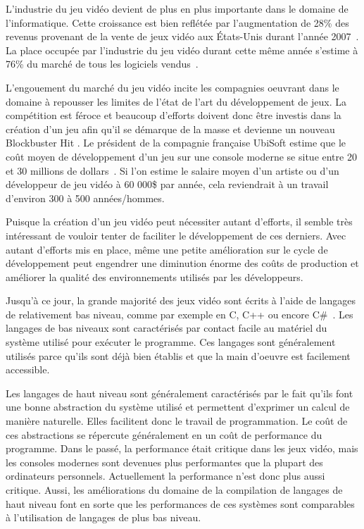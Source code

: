 \documentclass[12pt,oneside,letterpaper,francais]{book}
\begin{document}
L'industrie du jeu vidéo devient de plus en plus importante dans le
domaine de l'informatique. Cette croissance est bien reflétée par
l'augmentation de 28\% des revenus provenant de la vente de jeux vidéo
aux États-Unis durant l'année 2007~\cite{NPD_Games_2007}. La place
occupée par l'industrie du jeu vidéo durant cette même année s'estime
à 76\% du marché de tous les logiciels vendus~\cite{NPD_Soft_2008}. 

L'engouement du marché du jeu vidéo incite les compagnies oeuvrant
dans le domaine à repousser les limites de l'état de l'art du
développement de jeux. La compétition est féroce et beaucoup
d'efforts doivent donc être investis dans la création d'un jeu afin qu'il
se démarque de la masse et devienne un nouveau \og Blockbuster Hit
\fg. Le président de la compagnie française UbiSoft estime que le coût
moyen de développement d'un jeu sur une console moderne se situe entre
20 et 30 millions de dollars~\cite{cbc_ubisoft}. Si l'on estime le
salaire moyen d'un artiste ou d'un développeur de jeu vidéo à 60
000\$ par année, cela reviendrait à un travail d'environ 300 à 500
années/hommes.

Puisque la création d'un jeu vidéo peut nécessiter autant d'efforts,
il semble très intéressant de vouloir tenter de faciliter le
développement de ces derniers. Avec autant d'efforts mis en place,
même une petite amélioration sur le cycle de développement peut
engendrer une diminution énorme des coûts de production et améliorer
la qualité des environnements utilisés par les développeurs.

Jusqu'à ce jour, la grande majorité des jeux vidéo sont écrits à
l'aide de langages de relativement bas niveau, comme par exemple en C,
C++ ou encore C\#~\cite{CSHARP_SPEC}. Les langages de bas niveaux sont
caractérisés par contact facile au matériel du système utilisé pour
exécuter le programme. Ces langages sont généralement utilisés parce
qu'ils sont déjà bien établis et que la main d'oeuvre est facilement
accessible.

Les langages de haut niveau sont généralement caractérisés par le fait
qu'ils font une bonne abstraction du système utilisé et permettent
d'exprimer un calcul de manière naturelle. Elles facilitent donc le
travail de programmation. Le coût de ces abstractions se répercute
généralement en un coût de performance du programme. Dans le passé, la
performance était critique dans les jeux vidéo, mais les consoles
modernes sont devenues plus performantes que la plupart des
ordinateurs personnels. Actuellement la performance n'est donc plus
aussi critique. Aussi, les améliorations du domaine de la compilation
de langages de haut niveau font en sorte que les performances de ces
systèmes sont comparables à l'utilisation de langages de plus bas
niveau.
\end{document}
